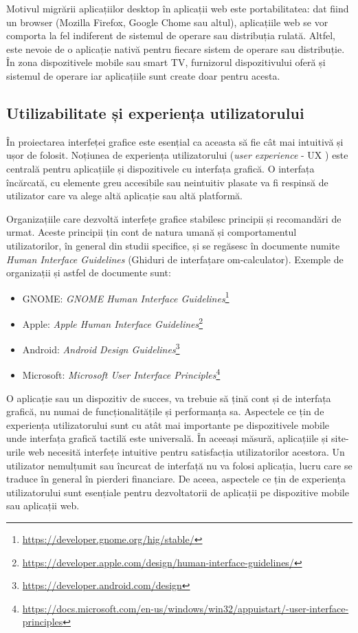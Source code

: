 Motivul migrării aplicațiilor desktop în aplicații web este portabilitatea: dat fiind un browser (Mozilla Firefox, Google Chome sau altul), aplicațiile web se vor comporta la fel indiferent de sistemul de operare sau distribuția rulată.
Altfel, este nevoie de o aplicație nativă pentru fiecare sistem de operare sau distribuție.
În zona dispozitivele mobile sau smart TV, furnizorul dispozitivului oferă și sistemul de operare iar aplicațiile sunt create doar pentru acesta.

\subsection{Utilizabilitate și experiența utilizatorului}
\label{sec:ui:ux}

În proiectarea interfeței grafice este esențial ca aceasta să fie cât mai intuitivă și ușor de folosit.
Noțiunea de experiența utilizatorului (\textit{user experience} - UX ) este centrală pentru aplicațiile și dispozitivele cu interfața grafică.
O interfața încărcată, cu elemente greu accesibile sau neintuitiv plasate va fi respinsă de utilizator care va alege altă aplicație sau altă platformă.

Organizațiile care dezvoltă interfețe grafice stabilesc principii și recomandări de urmat.
Aceste principii țin cont de natura umană și comportamentul utilizatorilor, în general din studii specifice, și se regăsesc în documente numite \textit{Human Interface Guidelines}  (Ghiduri de interfațare om-calculator).
Exemple de organizații și astfel de documente sunt:

\begin{itemize}
  \item GNOME: \textit{GNOME Human Interface Guidelines}\footnote{\url{https://developer.gnome.org/hig/stable/}}
  \item Apple: \textit{Apple Human Interface Guidelines}\footnote{\url{https://developer.apple.com/design/human-interface-guidelines/}}
  \item Android: \textit{Android Design Guidelines}\footnote{\url{https://developer.android.com/design}}
  \item Microsoft: \textit{Microsoft User Interface Principles}\footnote{\url{https://docs.microsoft.com/en-us/windows/win32/appuistart/-user-interface-principles}}
\end{itemize}

O aplicație sau un dispozitiv de succes, va trebuie să țină cont și de interfața grafică, nu numai de funcționalitățile și performanța sa.
Aspectele ce țin de experiența utilizatorului sunt cu atât mai importante pe dispozitivele mobile unde interfața grafică tactilă este universală.
În aceeași măsură, aplicațiile și site-urile web necesită interfețe intuitive pentru satisfacția utilizatorilor acestora.
Un utilizator nemulțumit sau încurcat de interfață nu va folosi aplicația, lucru care se traduce în general în pierderi financiare.
De aceea, aspectele ce țin de experiența utilizatorului sunt esențiale pentru dezvoltatorii de aplicații pe dispozitive mobile sau aplicații web.

